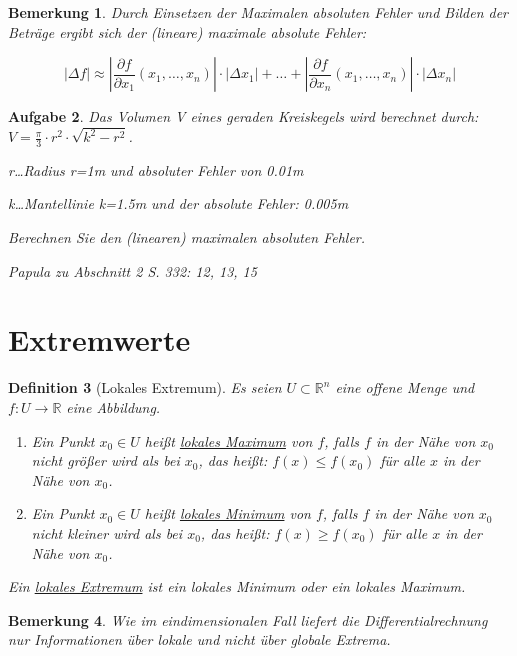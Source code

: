 \documentclass[12pt,a4paper]{scrreprt}
\newtheorem{defi}{Definition}[section]
\newtheorem{bemerkung}[defi]{Bemerkung}
\newtheorem{aufg}[defi]{Aufgabe}
\begin{document}
\begin{bemerkung}
	Durch Einsetzen der Maximalen absoluten Fehler und Bilden der Beträge ergibt sich der (lineare) maximale absolute Fehler:

	\[\left|\Delta f\right|\approx \left|\frac{\partial f}{\partial x_1}(x_1,\dots,x_n)\right|\cdot\left|\Delta x_1\right|+\dots+\left|\frac{\partial f}{\partial x_n}(x_1,\dots,x_n)\right|\cdot\left|\Delta x_n\right|\]
\end{bemerkung}

\begin{aufg}
	Das Volumen V eines geraden Kreiskegels wird berechnet durch: $V=\frac{\pi}{3}\cdot r^2 \cdot \sqrt{k^2-r^2}$.

	r\dots Radius r=1m und absoluter Fehler von 0.01m

	k\dots Mantellinie k=1.5m und der absolute Fehler: 0.005m

	Berechnen Sie den (linearen) maximalen absoluten Fehler.

	Papula zu Abschnitt 2 S. 332: 12, 13, 15
\end{aufg}

\section{Extremwerte}

\begin{defi}[Lokales Extremum]
	Es seien $U\subset\mathbb{R}^n$ eine offene Menge und $f:U\to\mathbb{R}$ eine Abbildung.
	\begin{enumerate}[label=(\roman*)]
		\item Ein Punkt $x_0\in U$ heißt \underline{lokales Maximum} von $f$, falls $f$ in der Nähe von $x_0$ nicht größer wird als bei $x_0$, das heißt:
		$f(x)\le f(x_0)$ für alle $x$ in der Nähe von $x_0$.
		\item Ein Punkt $x_0\in U$ heißt \underline{lokales Minimum} von $f$, falls $f$ in der Nähe von $x_0$ nicht kleiner wird als bei $x_0$, das heißt:
		$f(x)\ge f(x_0) $ für alle $x$ in der Nähe von $x_0$.
	\end{enumerate}
	Ein \underline{lokales Extremum} ist ein lokales Minimum oder ein lokales Maximum.
\end{defi}

\begin{bemerkung}
	Wie im eindimensionalen Fall liefert die Differentialrechnung nur Informationen über lokale und nicht über globale Extrema.
\end{bemerkung}
\end{document}

